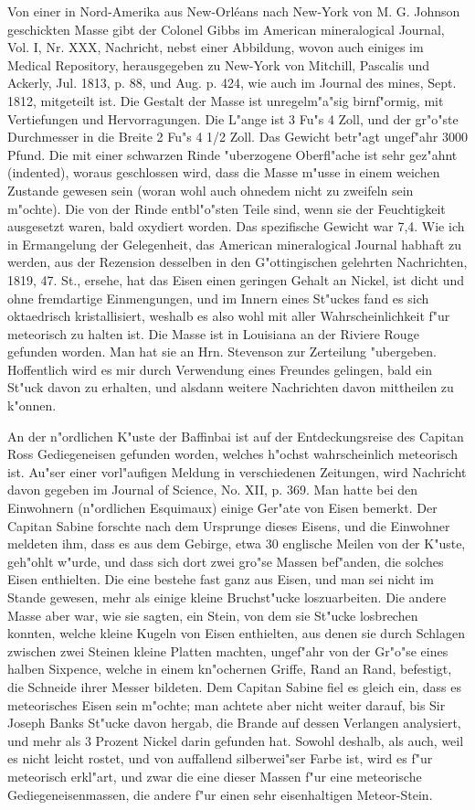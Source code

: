\documentclass[a4paper, 11pt, oneside, polutonikogreek, german]{article}
\begin{document}
Von einer in Nord-Amerika aus New-Orléans nach New-York von M. G. Johnson geschickten Masse gibt der Colonel Gibbs im American mineralogical Journal, Vol. I, Nr. XXX, Nachricht, nebst einer Abbildung, wovon auch einiges im Medical Repository, herausgegeben zu New-York von Mitchill, Pascalis und Ackerly, Jul. 1813, p. 88, und Aug. p. 424, wie auch im Journal des mines, Sept. 1812, mitgeteilt ist. Die Gestalt der Masse ist unregelm"a"sig birnf"ormig, mit Vertiefungen und Hervorragungen. Die L"ange ist 3 Fu"s 4 Zoll, und der gr"o"ste Durchmesser in die Breite 2 Fu"s 4 1/2 Zoll. Das Gewicht betr"agt ungef"ahr 3000 Pfund. Die mit einer schwarzen Rinde "uberzogene Oberfl"ache ist sehr gez"ahnt (indented), woraus geschlossen wird, dass die Masse m"usse in einem weichen Zustande gewesen sein (woran wohl auch ohnedem nicht zu zweifeln sein m"ochte). Die von der Rinde entbl"o"sten Teile sind, wenn sie der Feuchtigkeit ausgesetzt waren, bald oxydiert worden. Das spezifische Gewicht war 7,4. Wie ich in Ermangelung der Gelegenheit, das American mineralogical Journal habhaft zu werden, aus der Rezension desselben in den G"ottingischen gelehrten Nachrichten, 1819, 47. St., ersehe, hat das Eisen einen geringen Gehalt an Nickel, ist dicht und ohne fremdartige Einmengungen, und im Innern eines St"uckes fand es sich oktaedrisch kristallisiert, weshalb es also wohl mit aller Wahrscheinlichkeit f"ur meteorisch zu halten ist. Die Masse ist in Louisiana an der Riviere Rouge gefunden worden. Man hat sie an Hrn. Stevenson zur Zerteilung "ubergeben. Hoffentlich wird es mir durch Verwendung eines Freundes gelingen, bald ein St"uck davon zu erhalten, und alsdann weitere Nachrichten davon mittheilen zu k"onnen.

An der n"ordlichen K"uste der Baffinbai ist auf der Entdeckungsreise des Capitan Ross Gediegeneisen gefunden worden, welches h"ochst wahrscheinlich meteorisch ist. Au"ser einer vorl"aufigen Meldung in verschiedenen Zeitungen, wird Nachricht davon gegeben im Journal of Science, No. XII, p. 369. Man hatte bei den Einwohnern (n"ordlichen Esquimaux) einige Ger"ate von Eisen bemerkt. Der Capitan Sabine forschte nach dem Ursprunge dieses Eisens, und die Einwohner meldeten ihm, dass es aus dem Gebirge, etwa 30 englische Meilen von der K"uste, geh"ohlt w"urde, und dass sich dort zwei gro"se Massen bef"anden, die solches Eisen enthielten. Die eine bestehe fast ganz aus Eisen, und man sei nicht im Stande gewesen, mehr als einige kleine Bruchst"ucke loszuarbeiten. Die andere Masse aber war, wie sie sagten, ein Stein, von dem sie St"ucke losbrechen konnten, welche kleine Kugeln von Eisen enthielten, aus denen sie durch Schlagen zwischen zwei Steinen kleine Platten machten, ungef"ahr von der Gr"o"se eines halben Sixpence, welche in einem kn"ochernen Griffe, Rand an Rand, befestigt, die Schneide ihrer Messer bildeten. Dem Capitan Sabine fiel es gleich ein, dass es meteorisches Eisen sein m"ochte; man achtete aber nicht weiter darauf, bis Sir Joseph Banks St"ucke davon hergab, die Brande auf dessen Verlangen analysiert, und mehr als 3 Prozent Nickel darin gefunden hat. Sowohl deshalb, als auch, weil es nicht leicht rostet, und von auffallend silberwei"ser Farbe ist, wird es f"ur meteorisch erkl"art, und zwar die eine dieser Massen f"ur eine meteorische Gediegeneisenmassen, die andere f"ur einen sehr eisenhaltigen Meteor-Stein.
\end{document}
